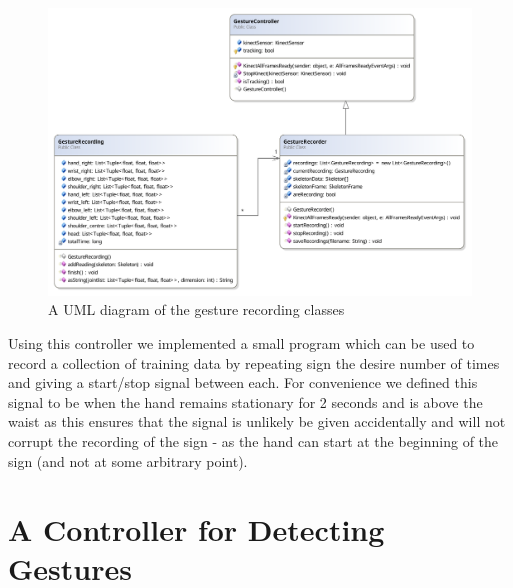 \begin{figure}[h!]
        \centering
        \includegraphics[width = 1.0\textwidth]{ThesisFigs/gestRecDiag}
        \caption{A UML diagram of the gesture recording classes}\label{fig:umlgest}
\end{figure}

Using this controller we implemented a small program which can be used to record a collection of training data by repeating sign the desire number of times and giving a start/stop signal between each. For convenience we defined this signal to be when the hand remains stationary for 2 seconds and is above the waist as this ensures that the signal is unlikely be given accidentally and will not corrupt the recording of the sign - as the hand can start at the beginning of the sign (and not at some arbitrary point).

\section{A Controller for Detecting Gestures}

 



